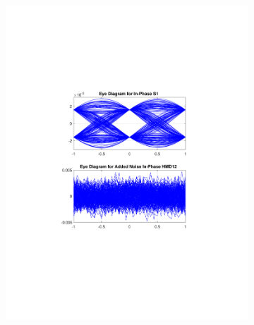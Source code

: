 \begin{figure}[H]
	\centering
	\begin{subfigure}{.45\textwidth}
		\centering
		\includegraphics[clip, trim=5cm 4cm 5cm 4cm, width=\textwidth]{./sdf/m_qam_system/figures/eyes/if_n_nmf_60_60_rc_03.pdf}
	\end{subfigure}
	\begin{subfigure}{.45\textwidth}
		\centering

\end{subfigure}
\end{figure}
